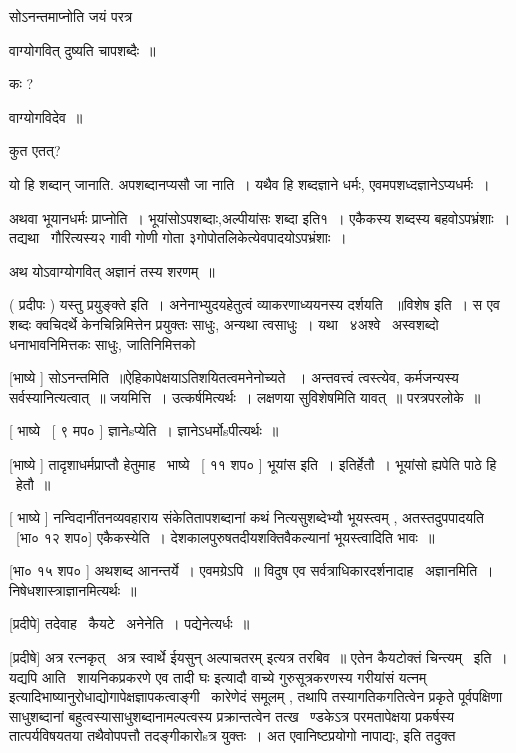\documentclass[11pt, openany]{book}
\begin{document}
सोऽनन्तमाप्नोति जयं परत्र 

 वाग्योगवित् दुष्यति चापशब्दैः~॥ 

 कः ? 

 वाग्योगविदेव~॥ 

 कुत एतत्? 

 यो हि शब्दान् जानाति. अपशब्दानप्यसौ जा नाति~। यथैव हि शब्दज्ञाने
धर्मः, एवमपशध्दज्ञानेऽप्यधर्मः~। 

 अथवा भूयानधर्मः प्राप्नोति~। भूयांसोऽपशब्दाः,अल्पीयांसः शब्दा
इति१~। एकैकस्य शब्दस्य बहवोऽपभ्रंशाः~। तद्यथा \textendash\ गौरित्यस्य२ गावी
गोणी गोता ३गोपोतलिकेत्येवपादयोऽपभ्रंशाः~। 

 अथ योऽवाग्योगवित् अज्ञानं तस्य शरणम्~॥ 

 ( प्रदीपः ) यस्तु प्रयुङ्क्ते इति~। अनेनाभ्युदयहेतुत्वं
व्याकरणाध्ययनस्य दर्शयति ~॥विशेष इति~। स एव शब्दः क्वचिदर्थे
केनचिन्निमित्तेन प्रयुक्तः साधुः, अन्यथा त्वसाधुः~। यथा \textendash\ ४अश्वे \textendash\ अस्वशब्दो
धनाभावनिमित्तकः साधुः, जातिनिमित्तको \textendash\ 



 [भाष्ये ] सोऽनन्तमिति~॥ऐहिकापेक्षयाऽतिशयितत्वमनेनोच्यते
~। अन्तवत्त्वं त्वस्त्येव, कर्मजन्यस्य सर्वस्यानित्यत्वात्~॥
जयमित्ति~। उत्कर्षमित्यर्थः~। लक्षणया सुविशेषमिति यावत्~॥
परत्रपरलोके~॥ 

 [ भाष्ये \textendash\ [ ९ मप० ] ज्ञानेsप्येति~। ज्ञानेऽधर्मोsपीत्यर्थः~॥ 

 [भाष्ये ] तादृशाधर्मप्राप्तौ हेतुमाह \textendash\ भाष्ये \textendash\ [ ११ शप० ] भूयांस
इति~। इतिर्हेतौ~। भूयांसो ह्यपेति पाठे हि \textendash\ हेतौ~॥ 

 [ भाष्ये ] नन्विदानींतनव्यवहाराय संकेतितापशब्दानां कथं
नित्यसुशब्देभ्यौ भूयस्त्वम् , अतस्तदुपपादयति \textendash\ [भा० १२ शप०]
एकैकस्येति~। देशकालपुरुषतदीयशक्तिवैकल्यानां भूयस्त्वादिति भावः~॥ 

 [भा० १५ शप० ] अथशब्द आनन्तर्ये~। एवमग्रेऽपि~॥ विदुष एव
सर्वत्राधिकारदर्शनादाह \textendash\ अज्ञानमिति~। निषेधशास्त्राज्ञानमित्यर्थः~॥ 

 [प्रदीपे] तदेवाह \textendash\ कैयटे \textendash\ अनेनेति~। पद्येनेत्यर्धः~॥ 

 [प्रदीषे] अत्र रत्नकृत् \textendash\ अत्र स्वार्थे ईयसुन् {\qt अल्पाचतरम्} इत्यत्र
तरबिव~॥ एतेन कैयटोक्तं चिन्त्यम् \textendash\ इति~। यद्यपि आति \textendash\ शायनिकप्रकरणे एव
{\qt तादी घः} इत्यादौ वाच्ये गुरुसूत्रकरणस्य {\qt गरीयांसं यत्नम्}
इत्यादिभाष्यानुरोधाद्योगापेक्षज्ञापकत्वाङ्गी \textendash\ कारेणेदं समूलम् , तथापि
तस्यागतिकगतित्वेन प्रकृते पूर्वपक्षिणा साधुशब्दानां
बहुत्वस्यासाधुशब्दानामल्पत्वस्य प्रक्रान्तत्वेन तत्ख \textendash\ ण्डकेऽत्र
परमतापेक्षया प्रकर्षस्य तात्पर्यविषयतया तथैवोपपत्तौ तदङ्गीकारोsत्र
युक्तः~। अत एवानिष्टप्रयोगो नापाद्यः, इति तदुक्त \textendash\ 
\end{document}
